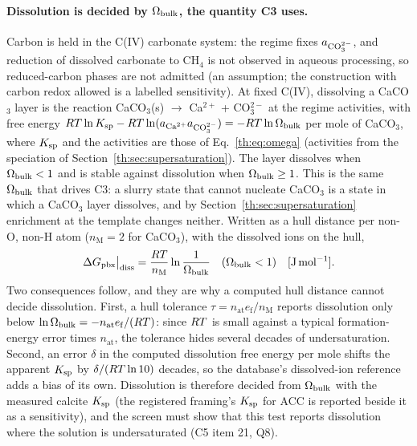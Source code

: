 \paragraph{Dissolution is decided by $\Omega_\mathrm{bulk}$, the quantity C3 uses.} Carbon is held in the C(IV)
carbonate system: the regime fixes $a_{\mathrm{CO}_3^{2-}}$, and reduction of dissolved carbonate to CH$_4$ is not
observed in aqueous processing, so reduced-carbon phases are not admitted (an assumption; the
construction with carbon redox allowed is a labelled sensitivity). At fixed C(IV), dissolving a
CaCO$_3$ layer is the reaction CaCO$_3$(s) $\to$ Ca$^{2+}$ + CO$_3^{2-}$ at the regime activities,
with free energy $R T\ln K_\mathrm{sp}-R T\ln(a_{\mathrm{Ca}^{2+}}a_{\mathrm{CO}_3^{2-}})=-R T\ln\Omega_\mathrm{bulk}$ per mole of CaCO$_3$, where $K_\mathrm{sp}$
and the activities are those of Eq.~\eqref{th:eq:omega} (activities from the speciation of
Section~\ref{th:sec:supersaturation}). The layer dissolves when $\Omega_\mathrm{bulk}<1$ and is stable against
dissolution when $\Omega_\mathrm{bulk}\ge1$. This is the same $\Omega_\mathrm{bulk}$ that drives C3: a slurry state that cannot
nucleate CaCO$_3$ is a state in which a CaCO$_3$ layer dissolves, and by
Section~\ref{th:sec:supersaturation} enrichment at the template changes neither. Written as a
hull distance per non-O, non-H atom ($n_\mathrm{M}=2$ for CaCO$_3$), with the dissolved ions on the
hull,
\begin{equation}\label{th:eq:pbx-omega}
\Delta G_\mathrm{pbx}\big|_\mathrm{diss}=\frac{R T}{n_\mathrm{M}}\ln\frac{1}{\Omega_\mathrm{bulk}}\quad(\Omega_\mathrm{bulk}<1) \quad[\mathrm{J\,mol^{-1}}].
\end{equation}
Two consequences follow, and they are why a computed hull distance cannot decide dissolution.
First, a hull tolerance $\tau=n_\mathrm{at}e_\mathrm{f}/n_\mathrm{M}$ reports dissolution only
below $\ln\Omega_\mathrm{bulk}=-n_\mathrm{at}e_\mathrm{f}/(R T)$: since $R T$ is small against a typical formation-energy
error times $n_\mathrm{at}$, the tolerance hides several decades of undersaturation. Second, an error $\delta$
in the computed dissolution free energy per mole shifts the apparent $K_\mathrm{sp}$ by
$\delta/(R T\ln10)$ decades, so the database's dissolved-ion reference adds a bias of its own.
Dissolution is therefore decided from $\Omega_\mathrm{bulk}$ with the measured calcite $K_\mathrm{sp}$ (the registered
framing's $K_\mathrm{sp}$ for ACC is reported beside it as a sensitivity), and the screen must show that
this test reports dissolution where the solution is undersaturated (C5 item 21, Q8).

